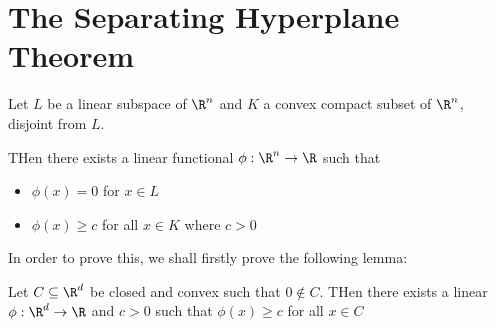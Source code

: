 \section{The Separating Hyperplane Theorem}
\begin{theo}{}
  Let $L$ be a linear subspace of $\R^n$ and $K$ a convex compact subset of $\R^n$, disjoint from $L$.\par
  \noindent THen there exists a linear functional $\phi:\R^n\to\R$ such that\par
  \begin{itemize}
    \item $\phi(x) = 0$ for $x\in L$
    \item $\phi(x)\geq c$ for all $x\in K$ where $c>0$
  \end{itemize}
\end{theo}\par
\noindent In order to prove this, we shall firstly prove the following lemma:\par
\begin{lem}[]{}
  Let $C\subseteq \R^d$ be closed and convex such that $0\not\in C$. THen there exists a linear $\phi:\R^d\to\R$ and $c>0$ such that $\phi(x)\geq c$ for all $x\in C$
\end{lem}
\par\bigskip
